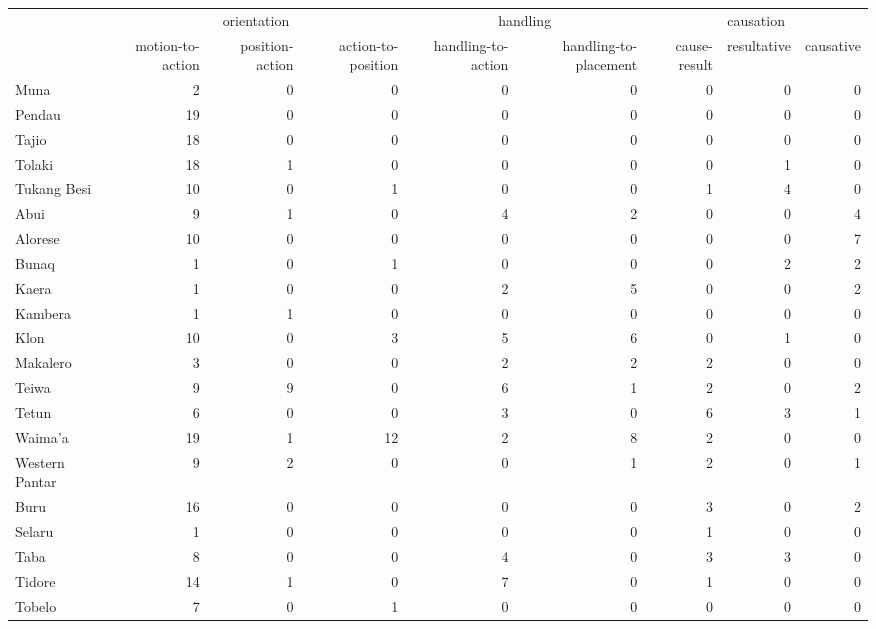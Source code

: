 \begin{table}


\begin{tabular}{l r r r r r r r r}
  \lsptoprule
& \multicolumn{3}{c|}{orientation} & \multicolumn{2}{c|}{handling} & \multicolumn{3}{c}{causation} \\
 & {motion-to-action} & {position-action} & {action-to-position} & {handling-to-action} & {handling-to-placement} & {cause-result} & {resultative} & {causative} \\ 
  \hline
  Muna &   2 &   0 &   0 &   0 &   0 &   0 &   0 &   0 \\ 
  Pendau &  19 &   0 &   0 &   0 &   0 &   0 &   0 &   0 \\ 
  Tajio &  18 &   0 &   0 &   0 &   0 &   0 &   0 &   0 \\ 
  Tolaki &  18 &   1 &   0 &   0 &   0 &   0 &   1 &   0 \\ 
  Tukang Besi &  10 &   0 &   1 &   0 &   0 &   1 &   4 &   0 \\ \hline
  Abui &   9 &   1 &   0 & 4 & 2 & 0 & 0 &   4 \\ 
  Alorese &  10 &   0 &   0 &   0 &   0 &   0 &   0 &   7 \\ 
  Bunaq &   1 &   0 &   1 &   0 &   0 &   0 &   2 &   2 \\ 
  Kaera &   1 &   0 &   0 &   2 &   5 &   0 &   0 &   2 \\ 
  Kambera &   1 &   1 &   0 &   0 &   0 &   0 &   0 &   0 \\ 
  Klon &  10 &   0 &   3 &   5 &   6 &   0 &   1 &   0 \\ 
  Makalero &   3 &   0 &   0 &   2 &   2 &   2 &   0 &   0 \\ 
  Teiwa &   9 &   9 &   0 &   6 &   1 &   2 &   0 &   2 \\ 
  Tetun &   6 &   0 &   0 &   3 &   0 &   6 &   3 &   1 \\ 
  Waima'a &  19 &   1 &   12 &   2 &   8 &   2 &   0 &  0 \\ 
  Western Pantar &   9 &   2 &   0 &   0 &   1 &   2 &   0 &   1 \\ \hline
  Buru & 16  &  0 & 0 & 0  & 0  &  3 & 0  &  2 \\
  Selaru &   1 &   0 &   0 &   0 &   0 &   1 &   0 &  0 \\ 
  Taba &   8 &   0 &   0 &   4 &   0 &   3 &   3 &  0 \\ 
  Tidore & 14 & 1 & 0 & 7  & 0  &  1 &  0 & 0 \\
  Tobelo &   7 &   0 &   1 &   0 &   0 &   0 &   0 & 0 \\ \hline

\end{tabular}
\end{table}
